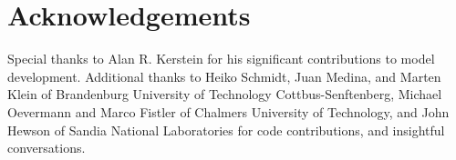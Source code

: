 \documentclass[preprint,12pt, a4paper]{elsarticle}
\begin{document}
\section*{Acknowledgements}
\label{acknowledgements}

Special thanks to Alan R. Kerstein for his significant contributions to model development. Additional thanks to Heiko Schmidt, Juan Medina, and Marten Klein of Brandenburg University of Technology Cottbus-Senftenberg, Michael Oevermann and Marco Fistler of Chalmers University of Technology, and John Hewson of Sandia National Laboratories for code contributions, and insightful conversations.




% 
% 
\end{document}
